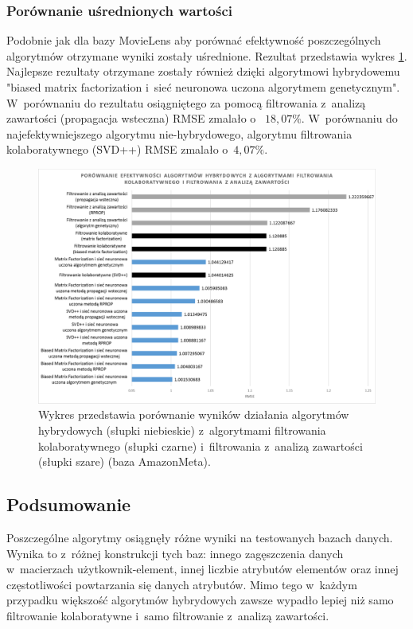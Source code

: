 \documentclass[twoside]{iisthesis}
\begin{document}
		\subsubsection{Porównanie uśrednionych wartości}
		
		Podobnie jak dla bazy MovieLens aby porównać efektywność poszczególnych algorytmów otrzymane wyniki zostały uśrednione. Rezultat przedstawia wykres \ref{fig:am_exphybrid}. Najlepsze rezultaty otrzymane zostały również dzięki algorytmowi hybrydowemu "biased matrix factorization i~sieć neuronowa uczona algorytmem genetycznym". W~porównaniu do rezultatu osiągniętego za pomocą filtrowania z~analizą zawartości (propagacja wsteczna) RMSE zmalało o~ $18,07\%$. W~porównaniu do najefektywniejszego algorytmu nie-hybrydowego, algorytmu filtrowania kolaboratywnego (SVD++) RMSE zmalało o~$4,07\%$.
		
		\begin{figure}
			\centering
			\includegraphics[width=1\textwidth]{am_exphybrid}	
			\caption{Wykres przedstawia porównanie wyników działania algorytmów hybrydowych (słupki niebieskie) z~algorytmami filtrowania kolaboratywnego (słupki czarne) i~filtrowania z~analizą zawartości (słupki szare) (baza AmazonMeta).}
			\label{fig:am_exphybrid}
		\end{figure}
		
		\subsection{Podsumowanie}
		
		Poszczególne algorytmy osiągnęły różne wyniki na testowanych bazach danych. Wynika to z~różnej konstrukcji tych baz: innego zagęszczenia danych w~macierzach użytkownik-element, innej liczbie atrybutów elementów oraz innej częstotliwości powtarzania się danych atrybutów. Mimo tego w~każdym przypadku większość algorytmów hybrydowych zawsze wypadło lepiej niż samo filtrowanie kolaboratywne i~samo filtrowanie z~analizą zawartości. 
	
\end{document}
